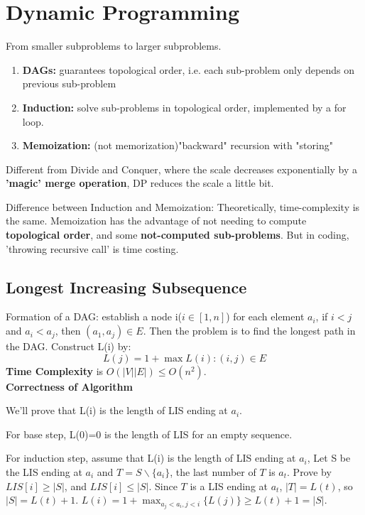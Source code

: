 \section{Dynamic Programming}
From smaller subproblems to larger subproblems. 
\begin{enumerate}[-]
    \item \textbf{DAGs:} guarantees topological order, i.e. each  sub-problem only depends on previous sub-problem
    \item \textbf{Induction:} solve sub-problems in topological order, implemented by a for loop.
    \item \textbf{Memoization:} (not memorization)"backward" recursion with "storing"
\end{enumerate}

Different from Divide and Conquer, where the scale decreases exponentially by a \textbf{'magic' merge operation}, 
DP reduces the scale a little bit.

Difference between Induction and Memoization: Theoretically, time-complexity is the same. 
Memoization has the advantage of not needing to compute \textbf{topological order}, and some \textbf{not-computed sub-problems}.
But in coding, 'throwing recursive call' is time costing.


\subsection{Longest Increasing Subsequence}
Formation of a DAG: establish a node i($i\in [1,n]$) for each element $a_i$, if $i<j$ and $a_i<a_j$, then $(a_1,a_j)\in E$.
Then the problem is to find the longest path in the DAG.
Construct L(i) by:
\[
    L(j)=1+\max{L(i):(i,j)\in E}\]
\textbf{Time Complexity} is $O(|V||E|)\leq O(n^2)$.\\
\textbf{Correctness of Algorithm} 

We'll prove that L(i) is the length of LIS ending at $a_i$.

For base step, L(0)=0 is the length of LIS for an empty sequence.

For induction step, assume that L(i) is the length of LIS ending at $a_i$, 
Let S be the LIS ending at $a_i$ and $T=S\backslash \{a_i\}$, the last number of $T$ is $a_t$.
Prove by $LIS[i]\geq |S|$, and $LIS[i]\leq |S|$.
Since $T$ is a LIS ending at $a_t$, $|T|=L(t)$, so $|S|=L(t)+1$. $L(i)=1+\max_{a_j<a_i,j<i}\{L(j)\}\geq L(t)+1=|S|$.

